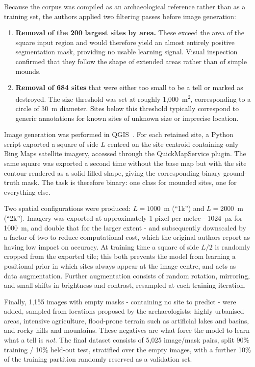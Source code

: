 Because the corpus was compiled as an archaeological reference rather than as a
training set, the authors applied two filtering passes before image generation:

\begin{enumerate}
  \item \textbf{Removal of the 200 largest sites by area.}
    These exceed the area of the square input region and would therefore yield an
    almost entirely positive segmentation mask, providing no usable learning signal.
    Visual inspection confirmed that they follow the shape of extended areas rather
    than of simple mounds.
  \item \textbf{Removal of 684 sites} that were either too small to be a tell or
    marked as destroyed.
    The size threshold was set at roughly 1{,}000~m\textsuperscript{2},
    corresponding to a circle of 30~m diameter.
    Sites below this threshold typically correspond to generic annotations for known
    sites of unknown size or imprecise location.
\end{enumerate}

Image generation was performed in QGIS~\cite{QGIS}.
For each retained site, a Python script exported a square of side $L$ centred on the
site centroid containing only Bing Maps satellite imagery, accessed through the
QuickMapService plugin.
The same square was exported a second time without the base map but with the site
contour rendered as a solid filled shape, giving the corresponding binary
ground-truth mask.
The task is therefore binary: one class for mounded sites, one for everything else.

Two spatial configurations were produced: $L = 1000$~m (``1k'') and $L = 2000$~m
(``2k'').
Imagery was exported at approximately 1 pixel per metre - 1024~px for 1000~m, and
double that for the larger extent - and subsequently downscaled by a factor of two
to reduce computational cost, which the original authors report as having low impact
on accuracy.
At training time a square of side $L/2$ is randomly cropped from the exported tile;
this both prevents the model from learning a positional prior in which sites always
appear at the image centre, and acts as data augmentation.
Further augmentation consists of random rotation, mirroring, and small shifts in
brightness and contrast, resampled at each training iteration.

Finally, 1{,}155 images with empty masks - containing no site to predict - were
added, sampled from locations proposed by the archaeologists: highly urbanised
areas, intensive agriculture, flood-prone terrain such as artificial lakes and
basins, and rocky hills and mountains.
These negatives are what force the model to learn what a tell is \emph{not}.
The final dataset consists of 5{,}025 image/mask pairs, split 90\% training /
10\% held-out test, stratified over the empty images, with a further 10\% of the
training partition randomly reserved as a validation set.

